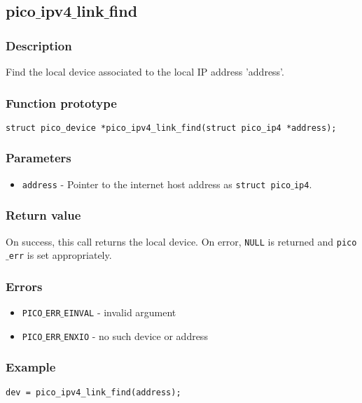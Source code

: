\subsection{pico$\_$ipv4$\_$link$\_$find}

\subsubsection*{Description}
Find the local device associated to the local IP address 'address'.

\subsubsection*{Function prototype}
\begin{verbatim}
struct pico_device *pico_ipv4_link_find(struct pico_ip4 *address);
\end{verbatim}

\subsubsection*{Parameters}
\begin{itemize}[noitemsep]
\item \texttt{address} - Pointer to the internet host address as \texttt{struct pico$\_$ip4}.
\end{itemize}

\subsubsection*{Return value}
On success, this call returns the local device.
On error, \texttt{NULL} is returned and \texttt{pico$\_$err} is set appropriately.

\subsubsection*{Errors}
\begin{itemize}[noitemsep]
\item \texttt{PICO$\_$ERR$\_$EINVAL} - invalid argument
\item \texttt{PICO$\_$ERR$\_$ENXIO} - no such device or address
\end{itemize}

\subsubsection*{Example}
\begin{verbatim}
dev = pico_ipv4_link_find(address);
\end{verbatim}



